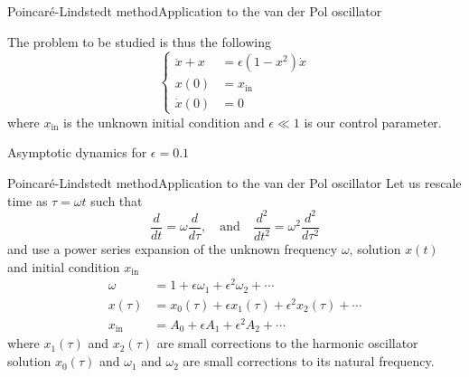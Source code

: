 \documentclass[usenames,dvipsnames,svgnames,10pt,aspectratio=169]{beamer}
\begin{document}
\begin{frame}[t, c]{Poincaré-Lindstedt method}{Application to the van der Pol oscillator}
  \begin{minipage}{.68\textwidth}
    The problem to be studied is thus the following
    \[
    \left\{
    \begin{aligned}
      \ddot{x} + x & = \epsilon \left( 1 - x^2 \right) \dot{x} \\
      x(0) & = x_{\text{in}} \\
      \dot{x}(0) & = 0
    \end{aligned}
    \right.
    \]
    where $x_{\text{in}}$ is the unknown initial condition and $\epsilon \ll 1$ is our control parameter.
  \end{minipage}%
  \hfill
  \begin{minipage}{.28\textwidth}
    \centering

    Asymptotic dynamics for $\epsilon = 0.1$
  \end{minipage}

\end{frame}

\begin{frame}[t, c]{Poincaré-Lindstedt method}{Application to the van der Pol oscillator}
  Let us rescale time as $\tau = \omega t$ such that
  \[
  \dfrac{d}{dt} = \omega \dfrac{d}{d\tau}, \quad \text{and} \quad \dfrac{d^2}{dt^2} = \omega^2 \dfrac{d^2}{d\tau^2}
  \]
  and use a power series expansion of the unknown frequency $\omega$, solution $x(t)$ and initial condition $x_{\text{in}}$
  \[
  \begin{aligned}
    \omega & = 1 + \epsilon \omega_1 + \epsilon^2 \omega_2 + \cdots \\
    x(\tau) & = x_0(\tau) + \epsilon x_1(\tau) + \epsilon^2 x_2(\tau) + \cdots \\
    x_{\text{in}} & = A_0 + \epsilon A_1 + \epsilon^2 A_2 + \cdots
  \end{aligned}
  \]
  where $x_1(\tau)$ and $x_2(\tau)$ are small corrections to the harmonic oscillator solution $x_0(\tau)$ and $\omega_1$ and $\omega_2$ are small corrections to its natural frequency.

  \vspace{1cm}
\end{frame}
\end{document}
